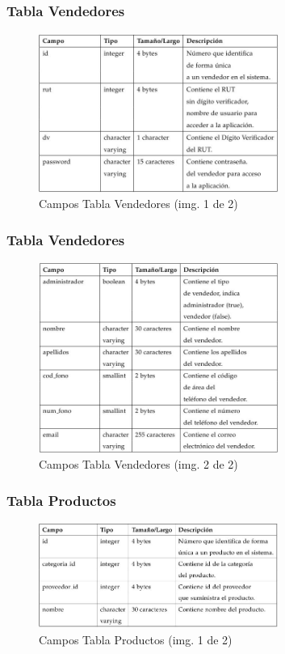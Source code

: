 \documentclass{beamer}
\begin{document}
\begin{frame}
\frametitle{Tabla Vendedores}
\begin{figure}
\includegraphics[width=0.7\textwidth]{images/tabla_vendedores1.jpg}
\caption{Campos Tabla Vendedores \tiny{(img. 1 de 2)}}
\end{figure}
\end{frame}

\begin{frame}
\frametitle{Tabla Vendedores}
\begin{figure}
\includegraphics[width=0.7\textwidth]{images/tabla_vendedores2.jpg}
\caption{Campos Tabla Vendedores \tiny{(img. 2 de 2)}}
\end{figure}
\end{frame}


\begin{frame}
\frametitle{Tabla Productos}
\begin{figure}
\includegraphics[width=0.7\textwidth]{images/tabla_productos1.jpg}
\caption{Campos Tabla Productos \tiny{(img. 1 de 2)}}
\end{figure}
\end{frame}
\end{document}
